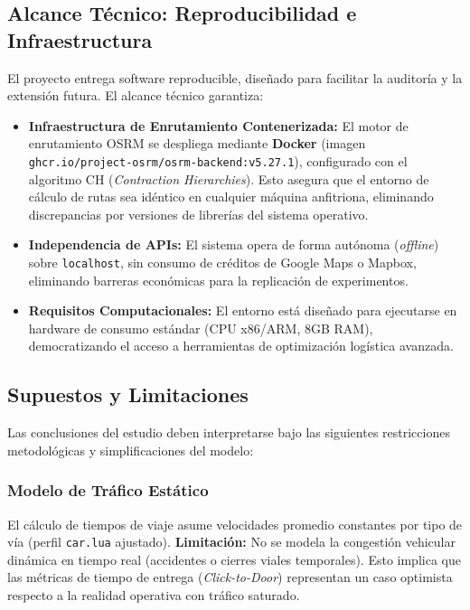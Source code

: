 \documentclass[12pt,letterpaper,oneside]{book}
\begin{document}
\subsection{Alcance Técnico: Reproducibilidad e Infraestructura}
El proyecto entrega software reproducible, diseñado para facilitar la auditoría y la extensión futura. El alcance técnico garantiza:

\begin{itemize}
	
	\item \textbf{Infraestructura de Enrutamiento Contenerizada:} El motor de enrutamiento OSRM se despliega mediante \textbf{Docker} (imagen \texttt{ghcr.io/project-osrm/osrm-backend:v5.27.1}), 
	configurado con el algoritmo CH (\textit{Contraction Hierarchies}). Esto asegura que el entorno de cálculo de rutas sea idéntico en cualquier máquina anfitriona, 
	eliminando discrepancias por versiones de librerías del sistema operativo.
	
	\item \textbf{Independencia de APIs:} El sistema opera de forma autónoma (\textit{offline}) sobre \texttt{localhost}, sin consumo de créditos de Google Maps o Mapbox, 
	eliminando barreras económicas para la replicación de experimentos.
	
	
	\item \textbf{Requisitos Computacionales:} El entorno está diseñado para ejecutarse en hardware de consumo estándar (CPU x86/ARM, 8GB RAM), democratizando 
	el acceso a herramientas de optimización logística avanzada.
\end{itemize}

\subsection{Supuestos y Limitaciones}
Las conclusiones del estudio deben interpretarse bajo las siguientes restricciones metodológicas y simplificaciones del modelo:

\subsubsection{Modelo de Tráfico Estático}
El cálculo de tiempos de viaje asume velocidades promedio constantes por tipo de vía 
(perfil \texttt{car.lua} ajustado). \textbf{Limitación:} No se modela la congestión 
vehicular dinámica en tiempo real (accidentes o cierres viales temporales). 
Esto implica que las métricas de tiempo de entrega (\textit{Click-to-Door}) representan un caso optimista 
respecto a la realidad operativa con tráfico saturado.
\end{document}
